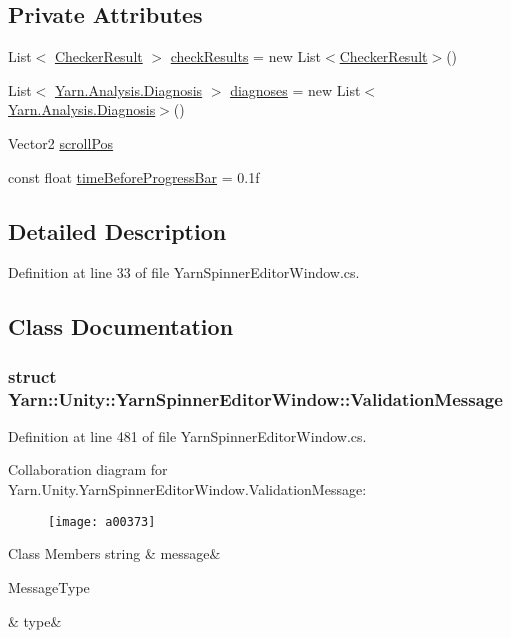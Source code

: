 \subsection*{Private Attributes}
\begin{DoxyCompactItemize}
\item 
List$<$ \hyperlink{a00043}{Checker\-Result} $>$ \hyperlink{a00180_aa85ab7bd194e5425b991b9c216d4d10e}{check\-Results} = new List$<$\hyperlink{a00043}{Checker\-Result}$>$()
\item 
List$<$ \hyperlink{a00085}{Yarn.\-Analysis.\-Diagnosis} $>$ \hyperlink{a00180_a25c92cbfdd09661a96714d05b14af886}{diagnoses} = new List$<$\hyperlink{a00085}{Yarn.\-Analysis.\-Diagnosis}$>$()
\item 
Vector2 \hyperlink{a00180_a2d9b9702b0980af9d4202aebd440124b}{scroll\-Pos}
\item 
const float \hyperlink{a00180_a62a14b3fbaf2da41154ebad0eb7b6d3f}{time\-Before\-Progress\-Bar} = 0.\-1f
\end{DoxyCompactItemize}


\subsection{Detailed Description}


Definition at line 33 of file Yarn\-Spinner\-Editor\-Window.\-cs.



\subsection{Class Documentation}
\label{a00371}
\hypertarget{a00180_a00371}{}
\subsubsection{struct Yarn\-:\-:Unity\-:\-:Yarn\-Spinner\-Editor\-Window\-:\-:Validation\-Message}


Definition at line 481 of file Yarn\-Spinner\-Editor\-Window.\-cs.



Collaboration diagram for Yarn.\-Unity.\-Yarn\-Spinner\-Editor\-Window.\-Validation\-Message\-:
\nopagebreak
\begin{figure}[H]
\begin{center}
\leavevmode
\texttt{[image: a00373]}
\end{center}
\end{figure}
\begin{DoxyFields}{Class Members}
\hypertarget{a00180_a636dce6708e779c201fa5e7d01cf2955}{string}\label{a00180_a636dce6708e779c201fa5e7d01cf2955}
&
message&
\\
\hline

\hypertarget{a00180_a7d342190c7657fbbe85eb6fa66bcabb8}{Message\-Type}\label{a00180_a7d342190c7657fbbe85eb6fa66bcabb8}
&
type&
\\
\hline

\end{DoxyFields}



